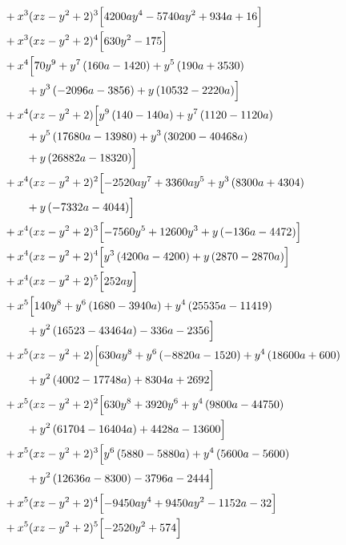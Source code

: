 \begin{align*}
&{}+x^{3}(xz-y^2+2)^{3}\Bigl[4200 a y^{4} - 5740 a y^{2} + 934 a + 16\Bigr]\\
&{}+x^{3}(xz-y^2+2)^{4}\Bigl[630 y^{2} - 175\Bigr]\\
&{}+x^{4}\Bigl[70 y^{9} + y^{7} \left(160 a - 1420\right) + y^{5} \left(190 a + 3530\right)\\
&\qquad + y^{3} \left(- 2096 a - 3856\right) + y \left(10532 - 2220 a\right)\Bigr]\\
&{}+x^{4}(xz-y^2+2)\Bigl[y^{9} \left(140 - 140 a\right) + y^{7} \left(1120 - 1120 a\right)\\
&\qquad + y^{5} \left(17680 a - 13980\right) + y^{3} \left(30200 - 40468 a\right)\\
&\qquad + y \left(26882 a - 18320\right)\Bigr]\\
&{}+x^{4}(xz-y^2+2)^{2}\Bigl[- 2520 a y^{7} + 3360 a y^{5} + y^{3} \left(8300 a + 4304\right)\\
&\qquad + y \left(- 7332 a - 4044\right)\Bigr]\\
&{}+x^{4}(xz-y^2+2)^{3}\Bigl[- 7560 y^{5} + 12600 y^{3} + y \left(- 136 a - 4472\right)\Bigr]\\
&{}+x^{4}(xz-y^2+2)^{4}\Bigl[y^{3} \left(4200 a - 4200\right) + y \left(2870 - 2870 a\right)\Bigr]\\
&{}+x^{4}(xz-y^2+2)^{5}\Bigl[252 a y\Bigr]\\
&{}+x^{5}\Bigl[140 y^{8} + y^{6} \left(1680 - 3940 a\right) + y^{4} \left(25535 a - 11419\right)\\
&\qquad + y^{2} \left(16523 - 43464 a\right) - 336 a - 2356\Bigr]\\
&{}+x^{5}(xz-y^2+2)\Bigl[630 a y^{8} + y^{6} \left(- 8820 a - 1520\right) + y^{4} \left(18600 a + 600\right)\\
&\qquad + y^{2} \left(4002 - 17748 a\right) + 8304 a + 2692\Bigr]\\
&{}+x^{5}(xz-y^2+2)^{2}\Bigl[630 y^{8} + 3920 y^{6} + y^{4} \left(9800 a - 44750\right)\\
&\qquad + y^{2} \left(61704 - 16404 a\right) + 4428 a - 13600\Bigr]\\
&{}+x^{5}(xz-y^2+2)^{3}\Bigl[y^{6} \left(5880 - 5880 a\right) + y^{4} \left(5600 a - 5600\right)\\
&\qquad + y^{2} \left(12636 a - 8300\right) - 3796 a - 2444\Bigr]\\
&{}+x^{5}(xz-y^2+2)^{4}\Bigl[- 9450 a y^{4} + 9450 a y^{2} - 1152 a - 32\Bigr]\\
&{}+x^{5}(xz-y^2+2)^{5}\Bigl[- 2520 y^{2} + 574\Bigr]\\

\end{align*}
